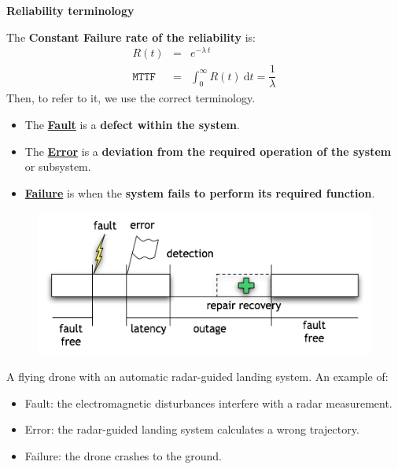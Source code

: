 \newpage

\begin{flushleft}
    \textcolor{Red2}{ \textbf{Reliability terminology}}
\end{flushleft}
The \textbf{Constant Failure rate of the reliability} is:
\begin{equation}
    \begin{array}{rcl}
        R\left(t\right) &=& e^{-\lambda \: t} \\ [.5em]
        \texttt{MTTF} &=& \displaystyle\int_{0}^{\infty} R\left(t\right) \:\mathrm{d}t = \dfrac{1}{\lambda}
    \end{array}
\end{equation}
Then, to refer to it, we use the correct terminology.
\begin{itemize}
    \item The \underline{\textbf{Fault}} is a \textbf{defect within the system}.
    \item The \underline{\textbf{Error}} is a \textbf{deviation from the required operation of the system} or subsystem.
    \item \underline{\textbf{Failure}} is when the \textbf{system fails to perform its required function}.
\end{itemize}
\begin{figure}[!htp]
    \centering
    \includegraphics[width=.8\textwidth]{img/reliability-and-availability-3.png}
\end{figure}

\begin{examplebox}
    A flying drone with an automatic radar-guided landing system. An example of:
    \begin{itemize}
        \item Fault: the electromagnetic disturbances interfere with a radar measurement.
        \item Error: the radar-guided landing system calculates a wrong trajectory.
        \item Failure: the drone crashes to the ground.
    \end{itemize}
\end{examplebox}


